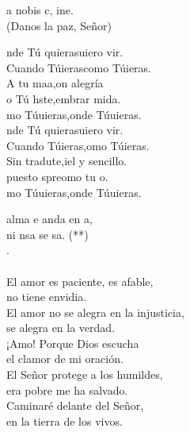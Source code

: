 \documentclass[12pt]{article}
\begin{document}
\begin{multicols*}{2}
\begin{cancion}%
	a nobis c, ine.\\
(Danos la paz, Señor)\\
\end{cancion}%

\begin{cancion}%
	nde Tú quierasuiero vir.\\
	Cuando Túierascomo Túieras. \\
	A tu maa,on alegría\\
	o Tú hste,embrar mida.\\
	mo Túuieras,onde Túuieras. \\
	nde Tú quierasuiero vir.\\
	Cuando Túieras,omo Túieras. \\
	Sin tradute,iel y sencillo.\\
	puesto spreomo tu o.\\
	mo Túuieras,onde Túuieras.\\
\end{cancion}%

\begin{cancion}%
	alma e anda en a,\\
	ni nsa  se sa. (**)\\
	.     \\
	\jump\\
El amor es paciente, es afable, \\
no tiene envidia.\\
El amor no se alegra en la injusticia, \\
se alegra en la verdad.\\
¡Amo! Porque Dios escucha \\
el clamor de mi oración. \\
El Señor protege a los humildes, \\
era pobre me ha salvado. \\
Caminaré delante del Señor, \\
en la tierra de los vivos.\\
\end{cancion}%


\end{multicols*}
\end{document}
